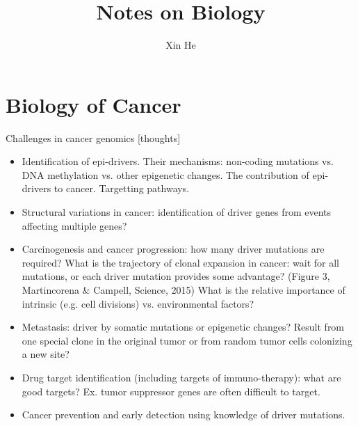 \documentclass{report}
\title{Notes on Biology}
\author{Xin He}
\begin{document}
\tableofcontents

\def\Var{{\rm Var}\,}
\def\E{{\rm E}\,}
\def\Cov{{\rm Cov}\,}
\def\tr{{\rm tr}\,}

\newcommand\independent{\protect\mathpalette{\protect\independenT}{\perp}}
    \def\independenT#1#2{\mathrel{\setbox0\hbox{$#1#2$}%
    \copy0\kern-\wd0\mkern4mu\box0}}
    
\providecommand{\abs}[1]{\lvert#1\rvert}
\providecommand{\norm}[1]{\lVert#1\rVert}
\chapter{Biology of Cancer}

Challenges in cancer genomics [thoughts]
\begin{itemize}
	\item Identification of epi-drivers. Their mechanisms: non-coding mutations vs. DNA methylation vs. other epigenetic changes. The contribution of epi-drivers to cancer. Targetting pathways. 
	
	\item Structural variations in cancer: identification of driver genes from events affecting multiple genes? 
	
	\item Carcinogenesis and cancer progression: how many driver mutations are required? What is the trajectory of clonal expansion in cancer: wait for all mutations, or each driver mutation provides some advantage? (Figure 3, Martincorena \& Campell, Science, 2015) What is the relative importance of intrinsic (e.g. cell divisions) vs. environmental factors? 
	
	\item Metastasis: driver by somatic mutations or epigenetic changes? Result from one special clone in the original tumor or from random tumor cells colonizing a new site? 
	
	\item Drug target identification (including targets of immuno-therapy): what are good targets? Ex. tumor suppressor genes are often difficult to target. 
	
	\item Cancer prevention and early detection using knowledge of driver mutations. 
\end{itemize} 
\end{document}
